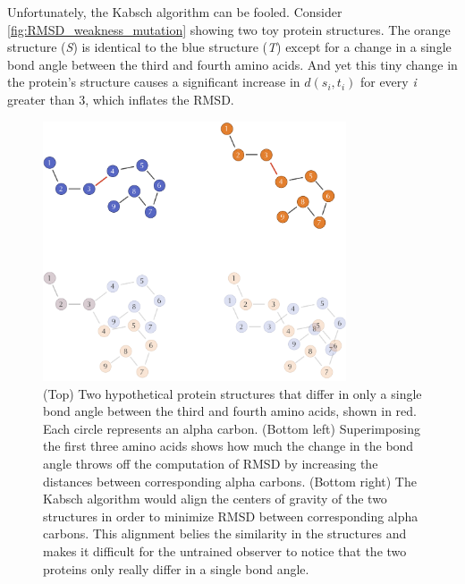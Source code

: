 \begin{qbox}\end{qbox}

Unfortunately, the Kabsch algorithm can be fooled. Consider \autoref{fig:RMSD_weakness_mutation} showing two toy protein structures. The orange structure (\textit{S}) is identical to the blue structure (\textit{T}) except for a change in a single bond angle between the third and fourth amino acids. And yet this tiny change in the protein's structure causes a significant increase in $d(s_{i}, t_{i})$ for every \textit{i} greater than 3, which inflates the RMSD.

\begin{figure}[p]
	\centering
	\mySfFamily
	\includegraphics[width = 0.8\textwidth]{../images/RMSD_weakness_mutation.png}
	\caption{(Top) Two hypothetical protein structures that differ in only a single bond angle between the third and fourth amino acids, shown in red. Each circle represents an alpha carbon. (Bottom left) Superimposing the first three amino acids shows how much the change in the bond angle throws off the computation of RMSD by increasing the distances between corresponding alpha carbons. (Bottom right) The Kabsch algorithm would align the centers of gravity of the two structures in order to minimize RMSD between corresponding alpha carbons. This alignment belies the similarity in the structures and makes it difficult for the untrained observer to notice that the two proteins only really differ in a single bond angle.}
	\label{fig:RMSD_weakness_mutation}
\end{figure}


